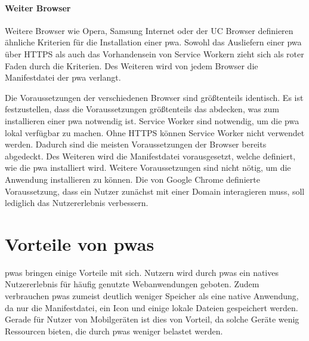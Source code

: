 \documentclass[12pt, parskip=half]{scrartcl}       %
\begin{document}
\paragraph{Weiter Browser}
Weitere Browser wie Opera\cite{devopera_pwainstallcriteria}, Samsung Internet\cite{samsung_pwainstallcriteria} oder der UC Browser\cite{ucweb_pwainstallcriteria} definieren ähnliche Kriterien für die Installation einer \ac{pwa}.
Sowohl das Ausliefern einer \ac{pwa} über HTTPS als auch das Vorhandensein von Service Workern zieht sich als roter Faden durch die Kriterien.
Des Weiteren wird von jedem Browser die Manifestdatei der \ac{pwa} verlangt.

Die Voraussetzungen der verschiedenen Browser sind größtenteils identisch.
Es ist festzustellen, dass die Voraussetzungen größtenteils das abdecken, was zum installieren einer \ac{pwa} notwendig ist.
Service Worker sind notwendig, um die \ac{pwa} lokal verfügbar zu machen.
Ohne HTTPS können Service Worker nicht verwendet werden.
Dadurch sind die meisten Voraussetzungen der Browser bereits abgedeckt.
Des Weiteren wird die Manifestdatei vorausgesetzt, welche definiert, wie die \ac{pwa} installiert wird.
Weitere Voraussetzungen sind nicht nötig, um die Anwendung installieren zu können.
Die von Google Chrome definierte Voraussetzung, dass ein Nutzer zunächst mit einer Domain interagieren muss, soll lediglich das Nutzererlebnis verbessern.


\section{Vorteile von \acp{pwa}}

\acp{pwa} bringen einige Vorteile mit sich.
Nutzern wird durch \acp{pwa} ein natives Nutzererlebnis für häufig genutzte Webanwendungen geboten.
Zudem verbrauchen \acp{pwa} zumeist deutlich weniger Speicher als eine native Anwendung, da nur die Manifestdatei, ein Icon und einige lokale Dateien gespeichert werden.
Gerade für Nutzer von Mobilgeräten ist dies von Vorteil, da solche Geräte wenig Ressourcen bieten, die durch \acp{pwa} weniger belastet werden.
\end{document}
